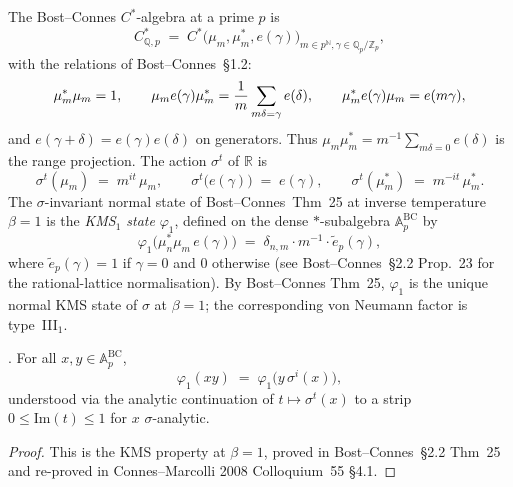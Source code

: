 The Bost--Connes \(C^{*}\)-algebra at a prime \(p\) is
\[
C^{*}_{\mathbb{Q},p}\;=\;C^{*}\bigl(\mu_{m},\mu_{m}^{*},e(\gamma)\bigr)_{m\in p^{\mathbb{N}},\gamma\in\mathbb{Q}_{p}/\mathbb{Z}_{p}},
\]
with the relations of Bost--Connes~\S1.2:
\[
\mu_{m}^{*}\mu_{m}=1,\qquad
\mu_{m}e(\gamma)\mu_{m}^{*}
   ={1\over m}\sum_{m\delta=\gamma}e(\delta),\qquad
\mu_{m}^{*}e(\gamma)\mu_{m}=e(m\gamma),
\]
and \(e(\gamma+\delta)=e(\gamma)e(\delta)\) on generators. Thus
\(\mu_{m}\mu_{m}^{*}=m^{-1}\sum_{m\delta=0}e(\delta)\) is the range
projection. The action \(\sigma^{t}\) of \(\mathbb{R}\) is
\begin{equation}
\label{v4-arith:kms-gns:eq:sigma-time}
\sigma^{t}(\mu_{m})\;=\;m^{it}\,\mu_{m},\qquad
\sigma^{t}\bigl(e(\gamma)\bigr)\;=\;e(\gamma),\qquad
\sigma^{t}(\mu_{m}^{*})\;=\;m^{-it}\,\mu_{m}^{*}.
\end{equation}
The \(\sigma\)-invariant normal state of Bost--Connes~Thm~25 at
inverse temperature \(\beta=1\) is the \emph{KMS\({}_{1}\) state}
\(\varphi_{1}\), defined on the dense \(*\)-subalgebra
\(\mathbb{A}^{\mathrm{BC}}_{p}\) by
\begin{equation}
\label{v4-arith:kms-gns:eq:phi-1}
\varphi_{1}\bigl(\mu_{n}^{*}\mu_{m}\,e(\gamma)\bigr)\;=\;\delta_{n,m}\cdot m^{-1}\cdot\widetilde{e}_{p}(\gamma),
\end{equation}
where \(\widetilde{e}_{p}(\gamma)=1\) if \(\gamma=0\) and \(0\) otherwise
(see Bost--Connes~\S2.2 Prop.~23 for the rational-lattice
normalisation). By Bost--Connes Thm~25, \(\varphi_{1}\) is the unique
normal KMS state of \(\sigma\) at \(\beta=1\); the corresponding von
Neumann factor is type~III\({}_{1}\).

\begin{lemma}
\label{v4-arith:kms-gns:lem:KMS-property}
\ClaimStatusProvedElsewhere. For all \(x,y\in\mathbb{A}^{\mathrm{BC}}_{p}\),
\begin{equation}
\label{v4-arith:kms-gns:eq:KMS}
\varphi_{1}(xy)\;=\;\varphi_{1}\bigl(y\,\sigma^{i}(x)\bigr),
\end{equation}
understood via the analytic continuation of \(t\mapsto\sigma^{t}(x)\)
to a strip \(0\leq\mathrm{Im}(t)\leq 1\) for \(x\) \(\sigma\)-analytic.
\end{lemma}

\begin{proof}
This is the KMS property at \(\beta=1\), proved in Bost--Connes~\S2.2
Thm~25 and re-proved in Connes--Marcolli 2008 Colloquium~55 \S4.1.
\end{proof}

